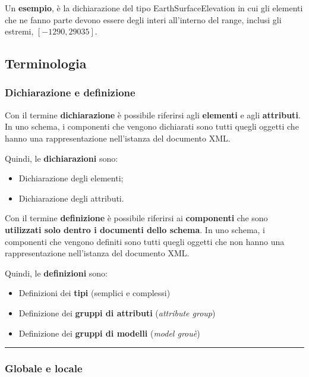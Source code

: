 \documentclass[a4paper]{article}
\newcommand{\longline}{\noindent\rule{\textwidth}{0.4pt}}
\begin{document}
	
	\noindent
	Un \textcolor{Green4}{\textbf{esempio}}, è la dichiarazione del tipo \textsf{EarthSurfaceElevation} in cui gli elementi che ne fanno parte devono essere degli interi all'interno del range, inclusi gli estremi, $\left[-1290, 29035\right]$.
	\newpage
	
	\subsection{Terminologia}
	
	\subsubsection{Dichiarazione e definizione}
	
	Con il termine \textcolor{Red3}{\textbf{dichiarazione}} è possibile riferirsi agli \textbf{elementi} e agli \textbf{attributi}. In uno schema, i componenti che vengono dichiarati sono tutti quegli oggetti che hanno una rappresentazione nell'istanza del documento XML.\newline
	
	\noindent
	Quindi, le \textbf{dichiarazioni} sono:
	\begin{itemize}
		\item Dichiarazione degli elementi;
		\item Dichiarazione degli attributi.
	\end{itemize}
	
	\noindent
	Con il termine \textcolor{Red3}{\textbf{definizione}} è possibile riferirsi ai \textbf{componenti} che sono \textbf{utilizzati solo dentro i documenti dello schema}. In uno schema, i componenti che vengono definiti sono tutti quegli oggetti che non hanno una rappresentazione nell'istanza del documento XML.\newline
	
	\noindent
	Quindi, le \textbf{definizioni} sono:
	\begin{itemize}
		\item Definizioni dei \textbf{tipi} (semplici e complessi)
		\item Definizione dei \textbf{gruppi di attributi} (\emph{attribute group})
		\item Definizione dei \textbf{gruppi di modelli} (\emph{model grouè})
	\end{itemize}
	
	\longline
	
	\subsubsection{Globale e locale}
	
\end{document}
